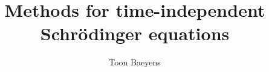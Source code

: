 

\title{Methods for time-independent Schrödinger equations}
\author{Toon Baeyens}



\maketitle

\cleardoublepage
{}
\tableofcontents









\cleardoublepage

\printbibliography[title=Bibliography,heading=bibintoc]


